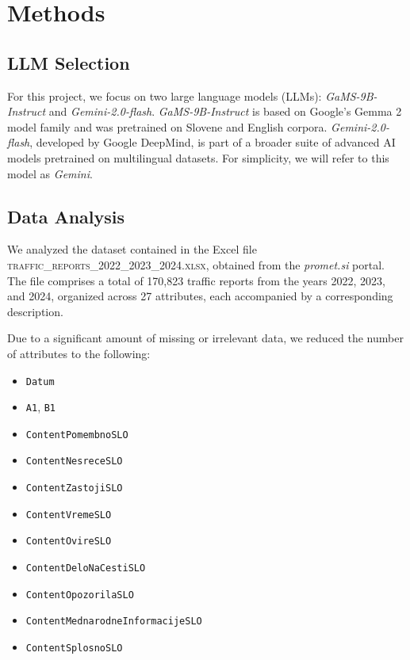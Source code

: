 \documentclass[fleqn,moreauthors,10pt]{ds_report}
\begin{document}
\section*{Methods}

\subsection*{LLM Selection}

For this project, we focus on two large language models (LLMs): \textit{GaMS-9B-Instruct} and \textit{Gemini-2.0-flash}. \textit{GaMS-9B-Instruct} is based on Google’s Gemma 2 model family and was pretrained on Slovene and English corpora. \textit{Gemini-2.0-flash}, developed by Google DeepMind, is part of a broader suite of advanced AI models pretrained on multilingual datasets. For simplicity, we will refer to this model as \textit{Gemini}.

\subsection*{Data Analysis}

We analyzed the dataset contained in the Excel file \textsc{traffic\_reports\_2022\_2023\_2024.xlsx}, obtained from the \textit{promet.si} portal. The file comprises a total of 170{,}823 traffic reports from the years 2022, 2023, and 2024, organized across 27 attributes, each accompanied by a corresponding description.

Due to a significant amount of missing or irrelevant data, we reduced the number of attributes to the following:
\begin{itemize}
    \item \texttt{Datum}
    \item \texttt{A1}, \texttt{B1}
    \item \texttt{ContentPomembnoSLO}
    \item \texttt{ContentNesreceSLO}
    \item \texttt{ContentZastojiSLO}
    \item \texttt{ContentVremeSLO}
    \item \texttt{ContentOvireSLO}
    \item \texttt{ContentDeloNaCestiSLO}
    \item \texttt{ContentOpozorilaSLO}
    \item \texttt{ContentMednarodneInformacijeSLO}
    \item \texttt{ContentSplosnoSLO}
\end{itemize}
\end{document}
